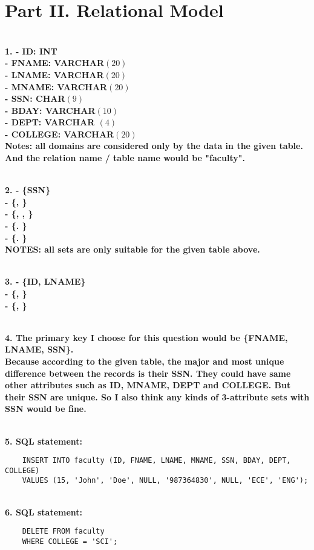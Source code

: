 \documentclass[letterpaper,11pt]{article}
\newcommand{\Paragraph}[1]{~\vspace*{-0.7\baselineskip}\\{\bf #1}}
\begin{document}
\section*{Part II. Relational Model}

\Paragraph{1.
	- ID: INT\\
	- FNAME: VARCHAR\((20)\)\\
	- LNAME: VARCHAR\((20)\)\\
	- MNAME: VARCHAR\((20)\)\\
	- SSN: CHAR\((9)\)\\
	- BDAY: VARCHAR\((10)\)\\
	- DEPT: VARCHAR \((4)\)\\
	- COLLEGE: VARCHAR\((20)\)\\
	Notes: all domains are considered only by the data in the given table. And the relation name / table name would be "faculty". 
}

\Paragraph{2.
	- \{SSN\}\\
	- \{, \}\\
	- \{\text{ID}, \text{FNAME}, \text{LNAME}\}\\
	- \{\text{FNAME}. \text{SSN}\}\\
	- \{\text{LNAME}. \text{SSN}\}\\
	NOTES: all sets are only suitable for the given table above. 
} 

\Paragraph{3.
	- \{ID, LNAME\}\\
	- \{, \}\\
	- \{\text{LNAME}, \text{SSN}\}\\
} 

\Paragraph{4. 
	The primary key I choose for this question would be \{FNAME, LNAME, SSN\}. \\
	Because according to the given table, the major and most unique difference between the records is 
	their SSN. They could have same other attributes such as ID, MNAME, DEPT and COLLEGE. But their SSN 
	are unique. So I also think any kinds of 3-attribute sets with SSN would be fine.\\ 
}

\Paragraph{5. SQL statement: }
\begin{verbatim}
	INSERT INTO faculty (ID, FNAME, LNAME, MNAME, SSN, BDAY, DEPT, COLLEGE)
	VALUES (15, 'John', 'Doe', NULL, '987364830', NULL, 'ECE', 'ENG');
\end{verbatim}

\Paragraph{6. SQL statement: }
\begin{verbatim}
	DELETE FROM faculty
	WHERE COLLEGE = 'SCI';
\end{verbatim}
\end{document}

